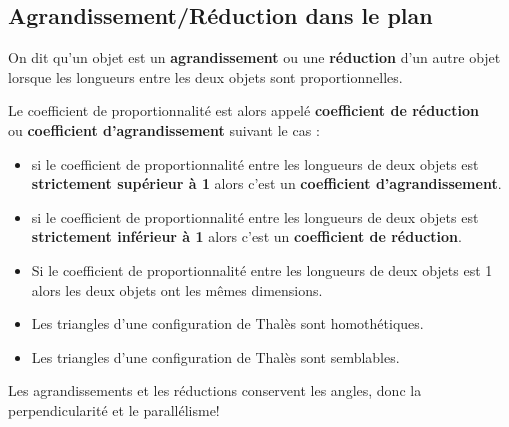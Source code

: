 \subsection{Agrandissement/Réduction dans le plan}

\begin{definition}
On dit qu'un objet est un \textbf{agrandissement} ou une \textbf{réduction} d'un autre objet lorsque les longueurs entre les deux objets sont proportionnelles.\par\vspace{0.25cm}
Le coefficient de proportionnalité est alors appelé \textbf{coefficient de réduction}\\
ou \textbf{coefficient d'agrandissement} suivant le cas :
\begin{itemize}
\item si le coefficient de proportionnalité entre les longueurs de deux objets est\\ \textbf{strictement supérieur à 1} alors c'est un \textbf{coefficient d'agrandissement}.
\item si le coefficient de proportionnalité entre les longueurs de deux objets est\\ \textbf{strictement inférieur à 1} alors c'est un \textbf{coefficient de réduction}.
\end{itemize}
\end{definition}

\begin{remarques}
\begin{itemize}
\item Si le coefficient de proportionnalité entre les longueurs de deux objets est 1 alors les deux objets ont les mêmes dimensions.
\item Les triangles d'une configuration de Thalès sont homothétiques.
\item Les triangles d'une configuration de Thalès sont semblables.
\end{itemize}
\end{remarques}

\begin{propriete}[\admise]
Les agrandissements et les réductions conservent les angles, donc la perpendicularité et le parallélisme!
\end{propriete}